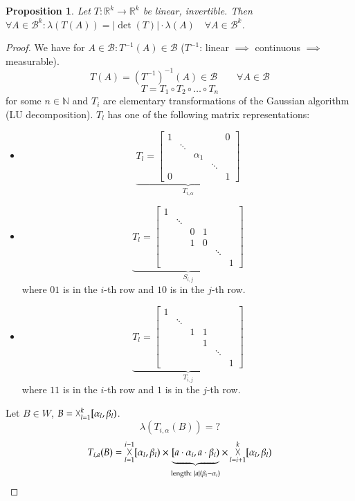 \documentclass{article}
\newtheorem{proposition}{Proposition}  \numberwithin{proposition}{section}
\newcommand{\card}[1]{\left|#1\right|}
\DeclareMathOperator*{\bigtimes}{\vartimes}
\begin{document}
\begin{proposition}
  Let $T: \mathbb R^k \to \mathbb R^k$ be linear, invertible.
  Then $\forall A \in \mathcal B^k: \lambda(T(A)) = \card{\det(T)} \cdot \lambda(A) \quad \forall A \in \mathcal B^k$.
\end{proposition}
\begin{proof}
  We have for $A \in \mathcal B: T^{-1}(A) \in \mathcal B$ ($T^{-1}$: linear $\implies$ continuous $\implies$ measurable).
  \[ T(A) = (T^{-1})^{-1}(A) \in \mathcal B \qquad \forall A \in \mathcal B \]
  \[ T = T_1 \circ T_2 \circ \ldots \circ T_n \]
  for some $n \in \mathbb N$ and $T_i$ are elementary transformations of the Gaussian algorithm (LU decomposition).
  $T_l$ has one of the following matrix representations:
  \begin{itemize}
    \item \[ \underbrace{T_l = \begin{bmatrix} 1 & & & & 0 \\ & \ddots & & & \\ & & \alpha_1 & & \\ & & & \ddots & \\ 0 & & & & 1 \end{bmatrix}}_{T_{i,\alpha}} \]
    \item \[ \underbrace{T_l = \begin{bmatrix} 1 & & & & & \\ & \ddots & & & & \\ & & 0 & 1 & & \\ & & 1 & 0 & & \\ & & & & \ddots & \\ & & & & & 1 \end{bmatrix}}_{S_{i,j}} \]
      where $01$ is in the $i$-th row and $10$ is in the $j$-th row.
    \item \[ \underbrace{T_l = \begin{bmatrix} 1 & & & & & \\ & \ddots & & & & \\ & & 1 & 1 & & \\ & & & 1 & & \\ & & & & \ddots & \\ & & & & & 1 \end{bmatrix}}_{T_{i,j}} \]
      where $11$ is in the $i$-th row and $1$ is in the $j$-th row.
  \end{itemize}
  Let $B \in W$, $B = \bigtimes_{l=1}^k [\alpha_l, \beta_l)$.
  \[ \lambda(T_{i,\alpha}(B)) = ? \]
  \[ T_{i,a}(B) = \bigtimes_{l=1}^{i-1} [\alpha_l, \beta_l) \times \underbrace{[a \cdot \alpha_i, a \cdot \beta_i)}_{\text{length: } \card{a} (\beta_i - \alpha_i)} \times \bigtimes_{l=i+1}^k [\alpha_l, \beta_l) \]

\end{proof}
\end{document}
